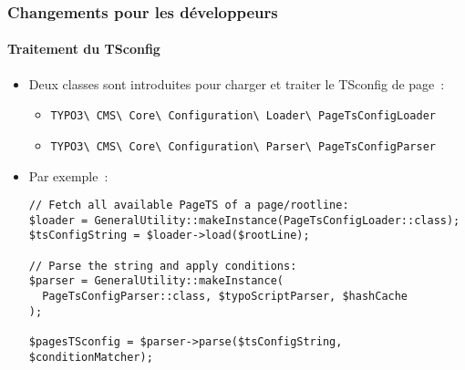 
\begin{frame}[fragile]
	\frametitle{Changements pour les développeurs}
	\framesubtitle{Traitement du TSconfig}

	\lstset{basicstyle=\tiny\ttfamily}

	\begin{itemize}
		\item Deux classes sont introduites pour charger et traiter le TSconfig de page~:
			\begin{itemize}\smaller
				\item \texttt{TYPO3\textbackslash
					CMS\textbackslash
					Core\textbackslash
					Configuration\textbackslash
					Loader\textbackslash
					PageTsConfigLoader}
				\item \texttt{TYPO3\textbackslash
					CMS\textbackslash
					Core\textbackslash
					Configuration\textbackslash
					Parser\textbackslash
					PageTsConfigParser}
			\end{itemize}

		\item Par exemple~:
\begin{lstlisting}
// Fetch all available PageTS of a page/rootline:
$loader = GeneralUtility::makeInstance(PageTsConfigLoader::class);
$tsConfigString = $loader->load($rootLine);

// Parse the string and apply conditions:
$parser = GeneralUtility::makeInstance(
  PageTsConfigParser::class, $typoScriptParser, $hashCache
);

$pagesTSconfig = $parser->parse($tsConfigString, $conditionMatcher);
\end{lstlisting}

	\end{itemize}

\end{frame}


